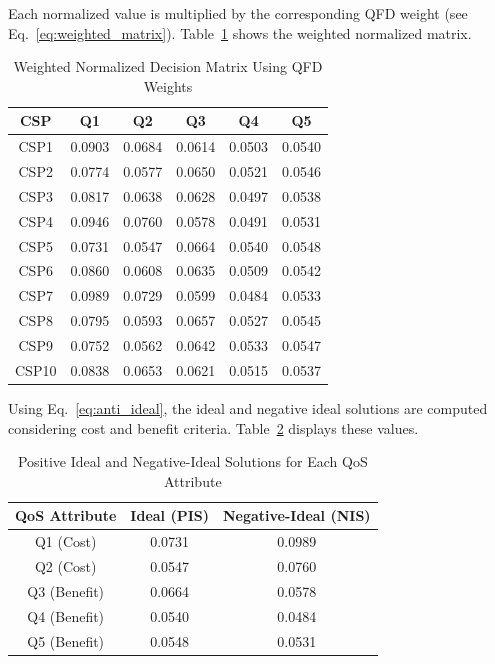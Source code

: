 \documentclass[twocolumn]{svjour3}
\begin{document}
Each normalized value is multiplied by the corresponding QFD weight (see Eq.~\ref{eq:weighted_matrix}). Table~\ref{tab:weighted_matrix} shows the weighted normalized matrix.

\begin{table}[H]
\centering
\caption{Weighted Normalized Decision Matrix Using QFD Weights}
\label{tab:weighted_matrix}
\begin{tabular}{|c|c|c|c|c|c|}
\hline
\textbf{CSP} & \textbf{Q1} & \textbf{Q2} & \textbf{Q3} & \textbf{Q4} & \textbf{Q5} \\
\hline
CSP1  & 0.0903 & 0.0684 & 0.0614 & 0.0503 & 0.0540 \\
CSP2  & 0.0774 & 0.0577 & 0.0650 & 0.0521 & 0.0546 \\
CSP3  & 0.0817 & 0.0638 & 0.0628 & 0.0497 & 0.0538 \\
CSP4  & 0.0946 & 0.0760 & 0.0578 & 0.0491 & 0.0531 \\
CSP5  & 0.0731 & 0.0547 & 0.0664 & 0.0540 & 0.0548 \\
CSP6  & 0.0860 & 0.0608 & 0.0635 & 0.0509 & 0.0542 \\
CSP7  & 0.0989 & 0.0729 & 0.0599 & 0.0484 & 0.0533 \\
CSP8  & 0.0795 & 0.0593 & 0.0657 & 0.0527 & 0.0545 \\
CSP9  & 0.0752 & 0.0562 & 0.0642 & 0.0533 & 0.0547 \\
CSP10 & 0.0838 & 0.0653 & 0.0621 & 0.0515 & 0.0537 \\
\hline
\end{tabular}
\end{table}

Using Eq.~\ref{eq:anti_ideal}, the ideal and negative ideal solutions are computed considering cost and benefit criteria. Table~\ref{tab:ideal_negative_sideways} displays these values.

\begin{table}[H]
\centering
\caption{Positive Ideal and Negative-Ideal Solutions for Each QoS Attribute}
\label{tab:ideal_negative_sideways}
\begin{tabular}{|c|c|c|}
\hline
\textbf{QoS Attribute} & \textbf{Ideal (PIS)} & \textbf{Negative-Ideal (NIS)} \\
\hline
Q1 (Cost)     & 0.0731 & 0.0989 \\
Q2 (Cost)     & 0.0547 & 0.0760 \\
Q3 (Benefit)  & 0.0664 & 0.0578 \\
Q4 (Benefit)  & 0.0540 & 0.0484 \\
Q5 (Benefit)  & 0.0548 & 0.0531 \\
\hline
\end{tabular}
\end{table}
\end{document}
